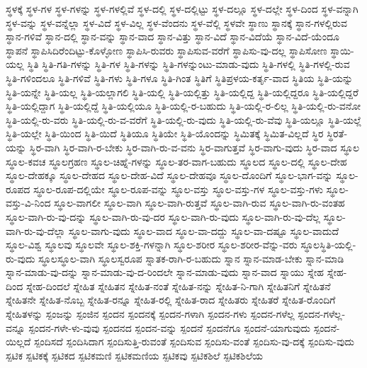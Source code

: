 {ಸ್ಥಳಕ್ಕೆ
ಸ್ಥಳ-ಗಳ
ಸ್ಥಳ-ಗಳನ್ನು
ಸ್ಥಳ-ಗಳಲ್ಲಿವೆ
ಸ್ಥಳ-ದಲ್ಲಿ
ಸ್ಥಳ-ದಲ್ಲಿಟ್ಟು
ಸ್ಥಳ-ದಲ್ಲೂ
ಸ್ಥಳ-ದಲ್ಲೇ
ಸ್ಥಳ-ದಿಂದ
ಸ್ಥಳ-ವನ್ನಾಗಿ
ಸ್ಥಳ-ವನ್ನು
ಸ್ಥಳ-ವನ್ನೆಲ್ಲಾ
ಸ್ಥಳ-ವಿದೆ
ಸ್ಥಳ-ವಿಲ್ಲ
ಸ್ಥಳ-ವೆಂದನು
ಸ್ಥಳ-ವೆಲ್ಲಿ
ಸ್ಥಳವೇ
ಸ್ಥಾಣು
ಸ್ಥಾನಕ್ಕೆ
ಸ್ಥಾನ-ಗಳಲ್ಲಿರುವ
ಸ್ಥಾನ-ಗಳಿವೆ
ಸ್ಥಾನ-ದಲ್ಲಿ
ಸ್ಥಾನ-ವನ್ನು
ಸ್ಥಾನ-ವಾದ
ಸ್ಥಾನ-ವಿತ್ತು
ಸ್ಥಾನ-ವಿದೆ
ಸ್ಥಾನ-ವಿದೆಯೆ
ಸ್ಥಾನ-ವಿದೆ-ಯೆಂದೂ
ಸ್ಥಾಪನೆ
ಸ್ಥಾಪಿಸಿದಿರೆಂದಿಟ್ಟು-ಕೊಳ್ಳೋಣ
ಸ್ಥಾಪಿಸಿ-ರುವರು
ಸ್ಥಾಪಿಸುವ-ವರೆಗೆ
ಸ್ಥಾಪಿಸು-ವು-ದಲ್ಲ
ಸ್ಥಾಪಿಸೋಣ
ಸ್ಥಾಯಿ-ಯಲ್ಲ
ಸ್ಥಿತಿ
ಸ್ಥಿತಿ-ಗತಿ-ಗಳನ್ನು
ಸ್ಥಿತಿ-ಗಳ
ಸ್ಥಿತಿ-ಗಳನ್ನು
ಸ್ಥಿತಿ-ಗಳನ್ನುಂಟು-ಮಾಡು-ವುದು
ಸ್ಥಿತಿ-ಗಳಲ್ಲಿ
ಸ್ಥಿತಿ-ಗಳಲ್ಲಿ-ರುವ
ಸ್ಥಿತಿ-ಗಳಿಂದಲೂ
ಸ್ಥಿತಿ-ಗಳಿವೆ
ಸ್ಥಿತಿ-ಗಳು
ಸ್ಥಿತಿ-ಗಳೂ
ಸ್ಥಿತಿ-ಗಿಂತ
ಸ್ಥಿತಿಗೆ
ಸ್ಥಿತಿಪ್ರಳಯ-ಕರ್ತೃ-ವಾದ
ಸ್ಥಿತಿಯ
ಸ್ಥಿತಿ-ಯನ್ನು
ಸ್ಥಿತಿ-ಯನ್ನೇ
ಸ್ಥಿತಿ-ಯಲ್ಲ
ಸ್ಥಿತಿ-ಯಲ್ಲಾಗಲಿ
ಸ್ಥಿತಿ-ಯಲ್ಲಿ
ಸ್ಥಿತಿ-ಯಲ್ಲಿತ್ತು
ಸ್ಥಿತಿ-ಯಲ್ಲಿದ್ದ
ಸ್ಥಿತಿ-ಯಲ್ಲಿದ್ದರೂ
ಸ್ಥಿತಿ-ಯಲ್ಲಿದ್ದರೆ
ಸ್ಥಿತಿ-ಯಲ್ಲಿದ್ದಾಗ
ಸ್ಥಿತಿ-ಯಲ್ಲಿದ್ದೆ
ಸ್ಥಿತಿ-ಯಲ್ಲಿಯೂ
ಸ್ಥಿತಿ-ಯಲ್ಲಿ-ರ-ಬಹುದು
ಸ್ಥಿತಿ-ಯಲ್ಲಿ-ರ-ಲಿಲ್ಲ
ಸ್ಥಿತಿ-ಯಲ್ಲಿ-ರು-ವನೋ
ಸ್ಥಿತಿ-ಯಲ್ಲಿ-ರು-ವರು
ಸ್ಥಿತಿ-ಯಲ್ಲಿ-ರು-ವ-ವರೆಗೆ
ಸ್ಥಿತಿ-ಯಲ್ಲಿ-ರು-ವುದು
ಸ್ಥಿತಿ-ಯಲ್ಲಿ-ರು-ವೆವು
ಸ್ಥಿತಿ-ಯಲ್ಲೂ
ಸ್ಥಿತಿ-ಯಲ್ಲೆ
ಸ್ಥಿತಿ-ಯಲ್ಲೇ
ಸ್ಥಿತಿ-ಯಿಂದ
ಸ್ಥಿತಿ-ಯಿದೆ
ಸ್ಥಿತಿಯೂ
ಸ್ಥಿತಿಯೇ
ಸ್ಥಿತಿ-ಯೊಂದನ್ನು
ಸ್ಥಿಮಿತಕ್ಕೆ
ಸ್ಥಿಮಿತ-ವಿಲ್ಲದೆ
ಸ್ಥಿರ
ಸ್ಥಿರತೆ-ಯನ್ನು
ಸ್ಥಿರ-ವಾಗಿ
ಸ್ಥಿರ-ವಾಗಿ-ರ-ಬೇಕು
ಸ್ಥಿರ-ವಾಗಿ-ರು-ವ-ವನು
ಸ್ಥಿರ-ವಾಗುತ್ತವೆ
ಸ್ಥಿರ-ವಾಗು-ವುದು
ಸ್ಥಿರ-ವಾದ
ಸ್ಥೂಲ
ಸ್ಥೂಲ-ಕವಚ
ಸ್ಥೂಲಗ್ರಹಣ
ಸ್ಥೂಲ-ಚಿಹ್ನೆ-ಗಳನ್ನು
ಸ್ಥೂಲ-ತರ-ವಾಗ-ಬಹುದು
ಸ್ಥೂಲದ
ಸ್ಥೂಲ-ದಲ್ಲಿ
ಸ್ಥೂಲ-ದೇಹ
ಸ್ಥೂಲ-ದೇಹಕ್ಕೂ
ಸ್ಥೂಲ-ದೇಹದ
ಸ್ಥೂಲ-ದೇಹ-ವಿದೆ
ಸ್ಥೂಲ-ದೇಹವೂ
ಸ್ಥೂಲ-ದೊಂದಿಗೆ
ಸ್ಥೂಲ-ಭಾಗ-ವನ್ನು
ಸ್ಥೂಲ-ರೂಪದ
ಸ್ಥೂಲ-ರೂಪ-ದಲ್ಲಿಯೇ
ಸ್ಥೂಲ-ರೂಪ-ವನ್ನು
ಸ್ಥೂಲ-ವಸ್ತು
ಸ್ಥೂಲ-ವಸ್ತು-ಗಳ
ಸ್ಥೂಲ-ವಸ್ತು-ಗಳು
ಸ್ಥೂಲ-ವಸ್ತು-ವಿ-ನಿಂದ
ಸ್ಥೂಲ-ವಾಗಲೀ
ಸ್ಥೂಲ-ವಾಗಿ
ಸ್ಥೂಲ-ವಾಗಿ-ರುತ್ತವೆ
ಸ್ಥೂಲ-ವಾಗಿ-ರುವ
ಸ್ಥೂಲ-ವಾಗಿ-ರು-ವಂತಹ
ಸ್ಥೂಲ-ವಾಗಿ-ರು-ವು-ದನ್ನು
ಸ್ಥೂಲ-ವಾಗಿ-ರು-ವು-ದರ
ಸ್ಥೂಲ-ವಾಗಿ-ರು-ವುದು
ಸ್ಥೂಲ-ವಾಗಿ-ರು-ವು-ದೆಲ್ಲ
ಸ್ಥೂಲ-ವಾಗಿ-ರು-ವು-ದೆಲ್ಲಾ
ಸ್ಥೂಲ-ವಾಗು-ವುದು
ಸ್ಥೂಲ-ವಾದ
ಸ್ಥೂಲ-ವಾ-ದದ್ದು
ಸ್ಥೂಲ-ವಾ-ದಷ್ಟೂ
ಸ್ಥೂಲ-ವಾದುದೆ
ಸ್ಥೂಲ-ವಿಶ್ವ
ಸ್ಥೂಲವು
ಸ್ಥೂಲವೇ
ಸ್ಥೂಲ-ಶಕ್ತಿ-ಗಳನ್ನಾಗಿ
ಸ್ಥೂಲ-ಶರೀರ
ಸ್ಥೂಲ-ಶರೀರ-ವೆನ್ನು-ವರು
ಸ್ಥೂಲಸ್ಥಿತಿ-ಯಲ್ಲಿ-ರು-ವುದು
ಸ್ಥೂಲಸ್ಥೂಲ-ವಾಗಿ
ಸ್ಥೂಲಸ್ವರೂಪ
ಸ್ನಾತಕ-ರಾಗಿ-ರ-ಬಹುದು
ಸ್ನಾನ
ಸ್ನಾನ-ಮಾಡ-ಬೇಕು
ಸ್ನಾನ-ಮಾಡಿ
ಸ್ನಾನ-ಮಾಡು-ವು-ದನ್ನು
ಸ್ನಾನ-ಮಾಡು-ವು-ದ-ರಿಂದಲೇ
ಸ್ನಾನ-ಮಾಡು-ವುದು
ಸ್ನಾನ-ವಾದ
ಸ್ನಾಯು
ಸ್ನೇಹ
ಸ್ನೇಹ-ದಿಂದ
ಸ್ನೇಹ-ದಿಂದಲೆ
ಸ್ನೇಹಿತ
ಸ್ನೇಹಿತನ
ಸ್ನೇಹಿತ-ನಂತೆ
ಸ್ನೇಹಿತ-ನನ್ನು
ಸ್ನೇಹಿತ-ನಿ-ಗಾಗಿ
ಸ್ನೇಹಿತನಿಗೆ
ಸ್ನೇಹಿತನೆ
ಸ್ನೇಹಿತನೇ
ಸ್ನೇಹಿತ-ನೊಬ್ಬ
ಸ್ನೇಹಿತ-ರನ್ನೂ
ಸ್ನೇಹಿತ-ರಲ್ಲಿ
ಸ್ನೇಹಿತ-ರಾದ
ಸ್ನೇಹಿತರು
ಸ್ನೇಹಿತರೆ
ಸ್ನೇಹಿತ-ರೊಂದಿಗೆ
ಸ್ನೇಹಿತಳನ್ನು
ಸ್ಪಂಜನ್ನು
ಸ್ಪಂಜಿನ
ಸ್ಪಂದನ
ಸ್ಪಂದನಕ್ಕೆ
ಸ್ಪಂದನ-ಗಳಾಗಿ
ಸ್ಪಂದನ-ಗಳು
ಸ್ಪಂದನ-ಗಳೆಲ್ಲ
ಸ್ಪಂದನ-ಗಳೆಲ್ಲ-ವನ್ನೂ
ಸ್ಪಂದನ-ಗಳೇ-ಳು-ವುವು
ಸ್ಪಂದನದ
ಸ್ಪಂದನ-ವನ್ನು
ಸ್ಪಂದನೆ
ಸ್ಪಂದನೆಗೂ
ಸ್ಪಂದನೆ-ಯಾಗುವುದು
ಸ್ಪಂದನೆ-ಯಿಲ್ಲದೆ
ಸ್ಪಂದಿಸದೆ
ಸ್ಪಂದಿಸಿದಾಗ
ಸ್ಪಂದಿಸುತ್ತಿ-ರುವಂತೆ
ಸ್ಪಂದಿಸುವ
ಸ್ಪಂದಿಸು-ವಂತೆ
ಸ್ಪಂದಿಸು-ವು-ದಕ್ಕೆ
ಸ್ಪಂದಿಸು-ವುದು
ಸ್ಪಟಿಕ
ಸ್ಪಟಿಕಕ್ಕೆ
ಸ್ಪಟಿಕದ
ಸ್ಪಟಿಕಮಣಿ
ಸ್ಪಟಿಕಮಣಿಯ
ಸ್ಪಟಿಕವು
ಸ್ಪಟಿಕಶಿಲೆ
ಸ್ಪಟಿಕಶಿಲೆಯ
}
